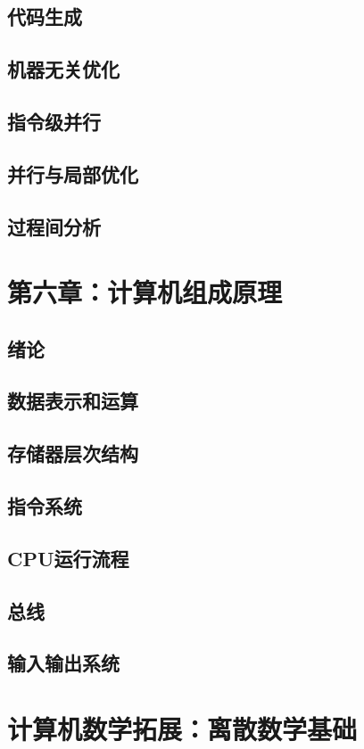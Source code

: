 \documentclass[UTF8]{book}
\begin{document}
        \section{代码生成}
        \section{机器无关优化}
        \section{指令级并行}
        \section{并行与局部优化}
        \section{过程间分析}
    \newpage
    \chapter{第六章：计算机组成原理}
        \section{绪论}
        \section{数据表示和运算}
        \section{存储器层次结构}
        \section{指令系统}
        \section{CPU运行流程}
        \section{总线}
        \section{输入输出系统}
    \newpage
    \chapter{计算机数学拓展：离散数学基础}
\end{document}
